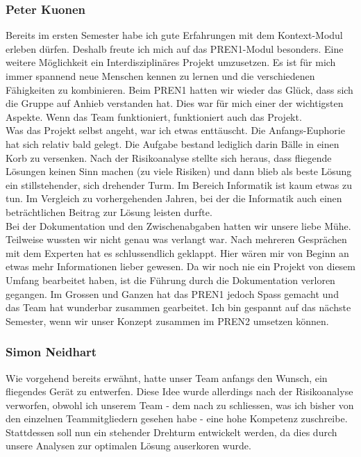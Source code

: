 \subsubsection*{Peter Kuonen}
Bereits im ersten Semester habe ich gute Erfahrungen mit dem Kontext-Modul erleben dürfen. Deshalb freute ich mich auf das PREN1-Modul besonders. Eine weitere Möglichkeit ein Interdisziplinäres Projekt umzusetzen. Es ist für mich immer spannend neue Menschen kennen zu lernen und die verschiedenen Fähigkeiten zu kombinieren. Beim PREN1 hatten wir wieder das Glück, dass sich die Gruppe auf Anhieb verstanden hat. Dies war für mich einer der wichtigsten Aspekte. Wenn das Team funktioniert, funktioniert auch das Projekt.\\
%
Was das Projekt selbst angeht, war ich etwas enttäuscht. Die Anfangs-Euphorie hat sich relativ bald gelegt. Die Aufgabe bestand lediglich darin Bälle in einen Korb zu versenken. Nach der Risikoanalyse stellte sich heraus, dass fliegende Lösungen keinen Sinn machen (zu viele Risiken) und dann blieb als beste Lösung ein stillstehender, sich drehender Turm. Im Bereich Informatik ist  kaum etwas zu tun. Im Vergleich zu vorhergehenden Jahren, bei der die Informatik auch einen beträchtlichen Beitrag zur Lösung leisten durfte.\\
%
Bei der Dokumentation und den Zwischenabgaben hatten wir unsere liebe Mühe. Teilweise wussten wir nicht genau was verlangt war. Nach mehreren Gesprächen mit dem Experten hat es  schlussendlich geklappt. Hier wären mir von Beginn an etwas mehr Informationen lieber gewesen. Da wir noch nie ein Projekt von diesem Umfang bearbeitet haben, ist die Führung durch die Dokumentation verloren gegangen. 
Im Grossen und Ganzen hat das PREN1 jedoch Spass gemacht und das Team hat wunderbar zusammen gearbeitet. Ich bin gespannt auf das nächste Semester, wenn wir unser Konzept zusammen im PREN2 umsetzen können.
\subsubsection*{Simon Neidhart}
Wie vorgehend bereits erwähnt, hatte unser Team anfangs den Wunsch, ein fliegendes Gerät zu entwerfen. Diese Idee wurde allerdings nach der Risikoanalyse verworfen, obwohl ich unserem Team - dem nach zu schliessen, was ich bisher von den einzelnen Teammitgliedern gesehen habe - eine hohe Kompetenz zuschreibe. Stattdessen soll nun ein stehender Drehturm entwickelt werden, da dies durch unsere Analysen zur optimalen Lösung auserkoren wurde.


